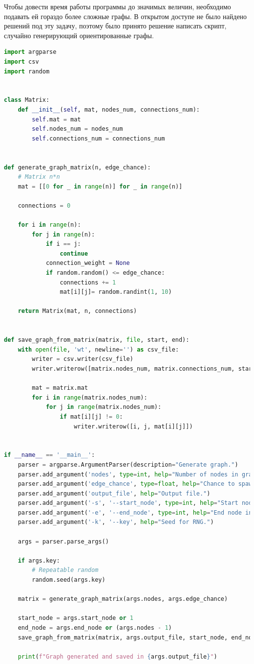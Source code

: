 \documentclass[utf8x, 14pt]{article}
\begin{document}
Чтобы довести время работы программы до значимых величин, необходимо подавать ей гораздо более сложные графы. В открытом доступе не было найдено решений под эту задачу, поэтому было принято решение написать скрипт, случайно генерирующий ориентированные графы.

\begin{lstlisting}[language=Python, frame=single, breaklines=true]
import argparse
import csv
import random


class Matrix:
	def __init__(self, mat, nodes_num, connections_num):
		self.mat = mat
		self.nodes_num = nodes_num
		self.connections_num = connections_num


def generate_graph_matrix(n, edge_chance):
	# Matrix n*n
	mat = [[0 for _ in range(n)] for _ in range(n)]
	
	connections = 0
	
	for i in range(n):
		for j in range(n):
			if i == j:
				continue
			connection_weight = None
			if random.random() <= edge_chance:
				connections += 1
				mat[i][j]= random.randint(1, 10)
	
	return Matrix(mat, n, connections)


def save_graph_from_matrix(matrix, file, start, end):
	with open(file, 'wt', newline='') as csv_file:
		writer = csv.writer(csv_file)
		writer.writerow([matrix.nodes_num, matrix.connections_num, start, end])
		
		mat = matrix.mat
		for i in range(matrix.nodes_num):
			for j in range(matrix.nodes_num):
				if mat[i][j] != 0:
					writer.writerow([i, j, mat[i][j]])


if __name__ == '__main__':
	parser = argparse.ArgumentParser(description="Generate graph.")
	parser.add_argument('nodes', type=int, help="Number of nodes in graph.")
	parser.add_argument('edge_chance', type=float, help="Chance to spawn edge for two nodes. This basically means that there will be approx. (n*n*edge_chance) edges in the graph.")
	parser.add_argument('output_file', help="Output file.")
	parser.add_argument('-s', '--start_node', type=int, help="Start node index.")
	parser.add_argument('-e', '--end_node', type=int, help="End node index.")
	parser.add_argument('-k', '--key', help="Seed for RNG.")
	
	args = parser.parse_args()
	
	if args.key:
		# Repeatable random
		random.seed(args.key)
		
	matrix = generate_graph_matrix(args.nodes, args.edge_chance)
	
	start_node = args.start_node or 1
	end_node = args.end_node or (args.nodes - 1)
	save_graph_from_matrix(matrix, args.output_file, start_node, end_node)
	
	print(f"Graph generated and saved in {args.output_file}")
\end{lstlisting}
\end{document}
